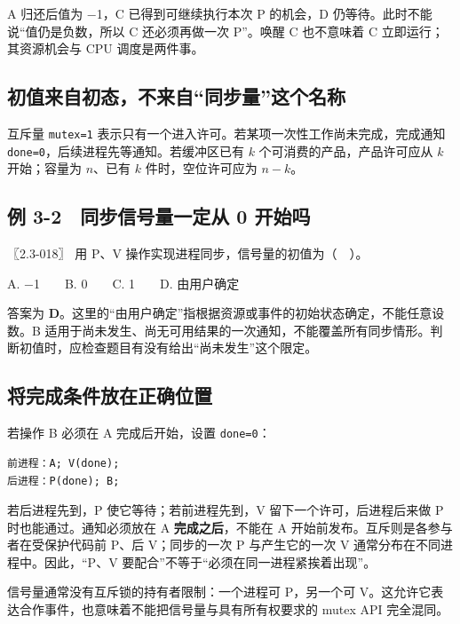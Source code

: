 A 归还后值为 −1，C 已得到可继续执行本次 P 的机会，D 仍等待。此时不能说``值仍是负数，所以 C 还必须再做一次 P''。唤醒 C 也不意味着 C 立即运行；其资源机会与 CPU 调度是两件事。

\subsection{初值来自初态，不来自``同步量''这个名称}\label{os-c03-h133}

互斥量 \texttt{mutex=1} 表示只有一个进入许可。若某项一次性工作尚未完成，完成通知 \texttt{done=0}，后续进程先等通知。若缓冲区已有 \(k\) 个可消费的产品，产品许可应从 \(k\) 开始；容量为 \(n\)、已有 \(k\) 件时，空位许可应为 \(n-k\)。

\subsection{例 3-2　同步信号量一定从 0 开始吗}\label{ex-err18}

\noindent{}〖2.3-018〗 用 P、V 操作实现进程同步，信号量的初值为（　）。

A. −1　　B. 0　　C. 1　　D. 由用户确定

答案为 \textbf{D}。这里的``由用户确定''指根据资源或事件的初始状态确定，不能任意设数。B 适用于尚未发生、尚无可用结果的一次通知，不能覆盖所有同步情形。判断初值时，应检查题目有没有给出``尚未发生''这个限定。

\subsection{将完成条件放在正确位置}\label{os-c03-h145}

若操作 B 必须在 A 完成后开始，设置 \texttt{done=0}：

\par\medskip\noindent
\begin{minipage}{\linewidth}
\begin{verbatim}
前进程：A; V(done);
后进程：P(done); B;
\end{verbatim}
\end{minipage}\par\medskip

若后进程先到，P 使它等待；若前进程先到，V 留下一个许可，后进程后来做 P 时也能通过。通知必须放在 A \textbf{完成之后}，不能在 A 开始前发布。互斥则是各参与者在受保护代码前 P、后 V；同步的一次 P 与产生它的一次 V 通常分布在不同进程中。因此，``P、V 要配合''不等于``必须在同一进程紧挨着出现''。

信号量通常没有互斥锁的持有者限制：一个进程可 P，另一个可 V。这允许它表达合作事件，也意味着不能把信号量与具有所有权要求的 mutex API 完全混同。

